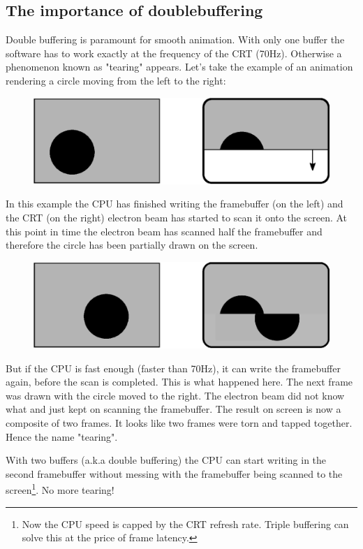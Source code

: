 \documentclass[book.tex]{subfiles}
\begin{document}
\subsection{The importance of doublebuffering}
Double buffering is paramount for smooth animation. With only one buffer the software has to work exactly at the frequency of the CRT (70Hz). Otherwise a phenomenon known as "tearing" appears. Let's take the example of an animation rendering a circle moving from the left to the right:
\par
\begin{figure}[H]
\centering
\includegraphics[width=\textwidth]{imgs/drawings/doublebuffer_before.eps}
\end{figure}
\par
In this example the CPU has finished writing the framebuffer (on the left) and the CRT (on the right) electron beam has started to scan it onto the screen. At this point in time the electron beam has scanned half the framebuffer and therefore the circle has been partially drawn on the screen.
\par
\begin{figure}[H]
\centering
\includegraphics[width=\textwidth]{imgs/drawings/doublebuffer_after.eps}
\end{figure}
\par
But if the CPU is fast enough (faster than 70Hz), it can write the framebuffer again, before the scan is completed. This is what happened here. The next frame was drawn with the circle moved to the right. The electron beam did not know what and just kept on scanning the framebuffer. The result on screen is now a composite of two frames. It looks like two frames were torn and tapped together. Hence the name "tearing".\\
\par
With two buffers (a.k.a double buffering) the CPU can start writing in the second framebuffer without messing with the framebuffer being scanned to the screen\footnote{Now the CPU speed is capped by the CRT refresh rate. Triple buffering can solve this at the price of frame latency.}. No more tearing!
\end{document}

